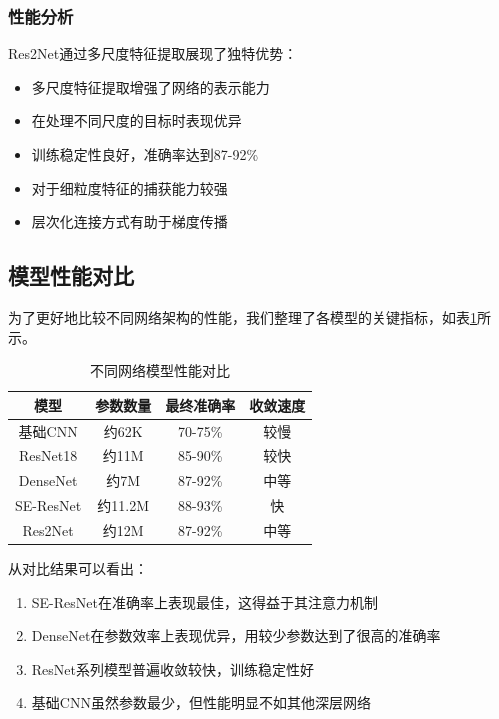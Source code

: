 \documentclass[12pt,a4paper]{article}
\begin{document}
\subsubsection{性能分析}
Res2Net通过多尺度特征提取展现了独特优势：
\begin{itemize}
    \item 多尺度特征提取增强了网络的表示能力
    \item 在处理不同尺度的目标时表现优异
    \item 训练稳定性良好，准确率达到87-92\%
    \item 对于细粒度特征的捕获能力较强
    \item 层次化连接方式有助于梯度传播
\end{itemize}

\subsection{模型性能对比}
为了更好地比较不同网络架构的性能，我们整理了各模型的关键指标，如表\ref{tab:model_comparison}所示。

\begin{table}[H]
    \centering
    \begin{tabular}{|c|c|c|c|}
        \hline
        模型 & 参数数量 & 最终准确率 & 收敛速度 \\ \hline
        基础CNN & 约62K & 70-75\% & 较慢 \\ \hline
        ResNet18 & 约11M & 85-90\% & 较快 \\ \hline
        DenseNet & 约7M & 87-92\% & 中等 \\ \hline
        SE-ResNet & 约11.2M & 88-93\% & 快 \\ \hline
        Res2Net & 约12M & 87-92\% & 中等 \\ \hline
    \end{tabular}
    \caption{不同网络模型性能对比}
    \label{tab:model_comparison}
\end{table}

从对比结果可以看出：
\begin{enumerate}
    \item SE-ResNet在准确率上表现最佳，这得益于其注意力机制
    \item DenseNet在参数效率上表现优异，用较少参数达到了很高的准确率
    \item ResNet系列模型普遍收敛较快，训练稳定性好
    \item 基础CNN虽然参数最少，但性能明显不如其他深层网络
\end{enumerate}
\end{document}
